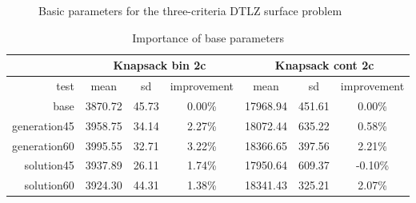 \begin{figure}
  \centering
  \caption{Basic parameters for the three-criteria DTLZ surface problem}
  \label{c3_surface_params}
\end{figure}


\begin{table}
  \centering
  \begin{tabular}{r c c c c c c}
    & \multicolumn{3}{c}{Knapsack bin 2c} & \multicolumn{3}{c}{Knapsack cont 2c} \\
    \hline
    test & mean & sd & improvement & mean & sd & improvement \\
    \hline
    \hline
    base & 3870.72 & 45.73 & 0.00\% & 17968.94 & 451.61 & 0.00\% \\
    generation45 & 3958.75 & 34.14 & 2.27\% & 18072.44 & 635.22 & 0.58\% \\
    generation60 & 3995.55 & 32.71 & 3.22\% & 18366.65 & 397.56 & 2.21\% \\
    solution45 & 3937.89 & 26.11 & 1.74\% & 17950.64 & 609.37 & -0.10\% \\
    solution60 & 3924.30 & 44.31 & 1.38\% & 18341.43 & 325.21 & 2.07\% \\

    \hline
  \end{tabular}
  \caption{Importance of base parameters}
  \label{t:base_imp_1}
\end{table}

